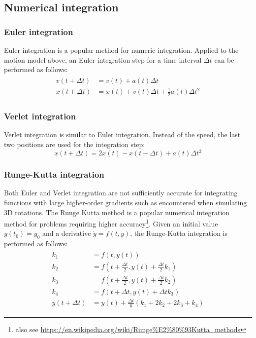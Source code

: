 \documentclass[12pt,a4paper,twoside]{article}
\begin{document}
\subsection{Numerical integration}
\subsubsection{Euler integration}
Euler integration is a popular method for numeric integration.
Applied to the motion model above, an Euler integration step for a time interval $\Delta t$ can be performed as follows:
\begin{align*}
  \begin{split}
    v(t + \Delta t) &= v(t) + a(t) \Delta t\\
    x(t + \Delta t) &= x(t) + v(t) \Delta t + \frac{1}{2} a(t) \Delta t^2
  \end{split}
\end{align*}

\subsubsection{Verlet integration}
Verlet integration is similar to Euler integration. Instead of the speed, the last two positions are used for the integration step:
\begin{equation*}
  x(t + \Delta t) = 2 x(t) - x(t - \Delta t) + a(t) \Delta t^2
\end{equation*}

\subsubsection{Runge-Kutta integration}
Both Euler and Verlet integration are not sufficiently accurate for integrating functions with large higher-order gradients such as encountered when simulating 3D rotations.
The Runge Kutta method is a popular numerical integration method for problems requiring higher accuracy\footnote{also see \url{https://en.wikipedia.org/wiki/Runge\%E2\%80\%93Kutta_methods}}.
Given an initial value $y(t_0)=y_0$ and a derivative $\dot{y}=f(t,y)$, the Runge-Kutta integration is performed as follows:
\begin{align*}
  \begin{split}
    k_1 &= f(t, y(t))\\
    k_2 &= f(t + \frac{\Delta t}{2}, y(t) + \frac{\Delta t}{2} k_1)\\
    k_3 &= f(t + \frac{\Delta t}{2}, y(t) + \frac{\Delta t}{2} k_2)\\
    k_4 &= f(t + \Delta t, y(t) + \Delta t k_3)\\
    y(t + \Delta t) &= y(t) + \frac{\Delta t}{6} (k_1 + 2 k_2 + 2 k_3 + k_4)
  \end{split}
\end{align*}
\end{document}
